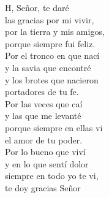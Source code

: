 \begin{cancion}%
	H, Señor, te daré \\
las gracias por mi vivir,\\
por la tierra y mis amigos, \\
porque siempre fui feliz.\\
	Por el tronco en que nací \\
y la savia que encontré\\
y los brotes que nacieron \\
portadores de tu fe.\\
	Por las veces que caí \\
y las que me levanté\\
porque siempre en ellas vi \\
el amor de tu poder.\\
	Por lo bueno que viví \\
y en lo que sentí dolor\\
siempre en todo yo te vi, \\
te doy gracias Señor\\
\end{cancion}%
